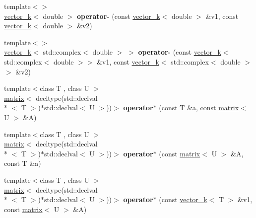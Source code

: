 \begin{DoxyCompactItemize}
\item 
\hypertarget{namespacekeycpp_a2a6e4104db7159c74673aacae14286ef}{{\footnotesize template$<$$>$ }\\\hyperlink{classkeycpp_1_1vector__k}{vector\-\_\-k}$<$ double $>$ {\bfseries operator-\/} (const \hyperlink{classkeycpp_1_1vector__k}{vector\-\_\-k}$<$ double $>$ \&v1, const \hyperlink{classkeycpp_1_1vector__k}{vector\-\_\-k}$<$ double $>$ \&v2)}\label{namespacekeycpp_a2a6e4104db7159c74673aacae14286ef}

\item 
\hypertarget{namespacekeycpp_a95c0f9757ba86c696c6c5bfa874c8a49}{{\footnotesize template$<$$>$ }\\\hyperlink{classkeycpp_1_1vector__k}{vector\-\_\-k}$<$ std\-::complex$<$ double $>$ $>$ {\bfseries operator-\/} (const \hyperlink{classkeycpp_1_1vector__k}{vector\-\_\-k}$<$ std\-::complex$<$ double $>$$>$ \&v1, const \hyperlink{classkeycpp_1_1vector__k}{vector\-\_\-k}$<$ std\-::complex$<$ double $>$$>$ \&v2)}\label{namespacekeycpp_a95c0f9757ba86c696c6c5bfa874c8a49}

\item 
\hypertarget{namespacekeycpp_a8d5dbf37b71d16d686dd0fdbad82f8fb}{{\footnotesize template$<$class T , class U $>$ }\\\hyperlink{classkeycpp_1_1matrix}{matrix}$<$ decltype(std\-::declval\\*
$<$ T $>$)$\ast$std\-::declval$<$ U $>$))$>$ {\bfseries operator$\ast$} (const T \&a, const \hyperlink{classkeycpp_1_1matrix}{matrix}$<$ U $>$ \&A)}\label{namespacekeycpp_a8d5dbf37b71d16d686dd0fdbad82f8fb}

\item 
\hypertarget{namespacekeycpp_ae187563f8f86e256bc1394edcba1b2b1}{{\footnotesize template$<$class T , class U $>$ }\\\hyperlink{classkeycpp_1_1matrix}{matrix}$<$ decltype(std\-::declval\\*
$<$ T $>$)$\ast$std\-::declval$<$ U $>$))$>$ {\bfseries operator$\ast$} (const \hyperlink{classkeycpp_1_1matrix}{matrix}$<$ U $>$ \&A, const T \&a)}\label{namespacekeycpp_ae187563f8f86e256bc1394edcba1b2b1}

\item 
\hypertarget{namespacekeycpp_a7a43db361f4a3128d89ad6a1db86686c}{{\footnotesize template$<$class T , class U $>$ }\\\hyperlink{classkeycpp_1_1matrix}{matrix}$<$ decltype(std\-::declval\\*
$<$ T $>$)$\ast$std\-::declval$<$ U $>$))$>$ {\bfseries operator$\ast$} (const \hyperlink{classkeycpp_1_1vector__k}{vector\-\_\-k}$<$ T $>$ \&v1, const \hyperlink{classkeycpp_1_1matrix}{matrix}$<$ U $>$ \&A)}\label{namespacekeycpp_a7a43db361f4a3128d89ad6a1db86686c}


\end{DoxyCompactItemize}
